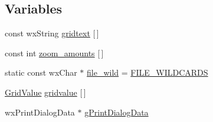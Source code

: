 \subsection*{Variables}
\begin{DoxyCompactItemize}
\item 
const wx\-String \hyperlink{a00230_a78f09467cace2629c2a2374a7f4bdc07}{gridtext} \mbox{[}$\,$\mbox{]}
\item 
const int \hyperlink{a00230_a78b0dfa6de03f88325ba95ae25f33320}{zoom\-\_\-amounts} \mbox{[}$\,$\mbox{]}
\item 
static const wx\-Char $\ast$ \hyperlink{a00230_a4841d82d107bf3e5331296d3527b192d}{file\-\_\-wild} = \hyperlink{a00237_a679ca74e08219209b5fd011946a83b62}{F\-I\-L\-E\-\_\-\-W\-I\-L\-D\-C\-A\-R\-D\-S}
\item 
\hyperlink{a00106}{Grid\-Value} \hyperlink{a00230_a75782416c96d40b05fd547805f028dbd}{gridvalue} \mbox{[}$\,$\mbox{]}
\item 
wx\-Print\-Dialog\-Data $\ast$ \hyperlink{a00230_a896ed5b078417657f1ceef1e87abe705}{g\-Print\-Dialog\-Data}
\end{DoxyCompactItemize}


